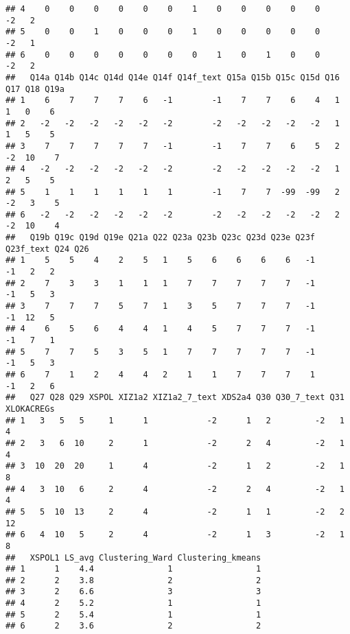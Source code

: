 \documentclass[
]{article}
\newenvironment{Shaded}{\begin{snugshade}}{\end{snugshade}}
\newcommand{\FunctionTok}[1]{\textcolor[rgb]{0.00,0.00,0.00}{#1}}
\newcommand{\NormalTok}[1]{#1}
\newcommand{\SpecialCharTok}[1]{\textcolor[rgb]{0.00,0.00,0.00}{#1}}
\begin{document}
\begin{verbatim}
## 4    0    0    0    0    0    0    1    0    0    0    0    0        -2   2
## 5    0    0    1    0    0    0    1    0    0    0    0    0        -2   1
## 6    0    0    0    0    0    0    0    1    0    1    0    0        -2   2
##   Q14a Q14b Q14c Q14d Q14e Q14f Q14f_text Q15a Q15b Q15c Q15d Q16 Q17 Q18 Q19a
## 1    6    7    7    7    6   -1        -1    7    7    6    4   1   1   0    6
## 2   -2   -2   -2   -2   -2   -2        -2   -2   -2   -2   -2   1   1   5    5
## 3    7    7    7    7    7   -1        -1    7    7    6    5   2  -2  10    7
## 4   -2   -2   -2   -2   -2   -2        -2   -2   -2   -2   -2   1   2   5    5
## 5    1    1    1    1    1    1        -1    7    7  -99  -99   2  -2   3    5
## 6   -2   -2   -2   -2   -2   -2        -2   -2   -2   -2   -2   2  -2  10    4
##   Q19b Q19c Q19d Q19e Q21a Q22 Q23a Q23b Q23c Q23d Q23e Q23f Q23f_text Q24 Q26
## 1    5    5    4    2    5   1    5    6    6    6    6   -1        -1   2   2
## 2    7    3    3    1    1   1    7    7    7    7    7   -1        -1   5   3
## 3    7    7    7    5    7   1    3    5    7    7    7   -1        -1  12   5
## 4    6    5    6    4    4   1    4    5    7    7    7   -1        -1   7   1
## 5    7    7    5    3    5   1    7    7    7    7    7   -1        -1   5   3
## 6    7    1    2    4    4   2    1    1    7    7    7    1        -1   2   6
##   Q27 Q28 Q29 XSPOL XIZ1a2 XIZ1a2_7_text XDS2a4 Q30 Q30_7_text Q31 XLOKACREGs
## 1   3   5   5     1      1            -2      1   2         -2   1          4
## 2   3   6  10     2      1            -2      2   4         -2   1          4
## 3  10  20  20     1      4            -2      1   2         -2   1          8
## 4   3  10   6     2      4            -2      2   4         -2   1          4
## 5   5  10  13     2      4            -2      1   1         -2   2         12
## 6   4  10   5     2      4            -2      1   3         -2   1          8
##   XSPOL1 LS_avg Clustering_Ward Clustering_kmeans
## 1      1    4.4               1                 1
## 2      2    3.8               2                 2
## 3      2    6.6               3                 3
## 4      2    5.2               1                 1
## 5      2    5.4               1                 1
## 6      2    3.6               2                 2
\end{verbatim}

\begin{Shaded}
\end{Shaded}
\end{document}

